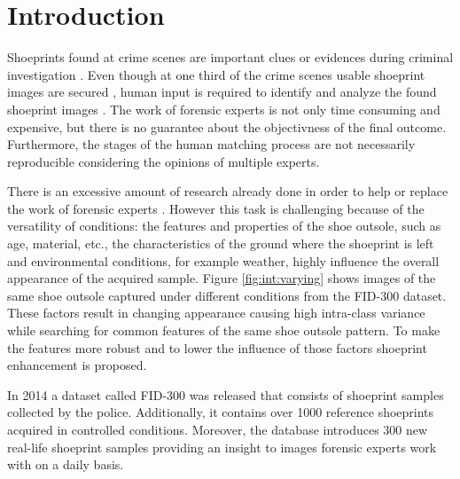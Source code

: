 \documentclass[draft,final]{vutinfth} %
\begin{document}
\chapter{Introduction}

\par
Shoeprints found at crime scenes are important clues or evidences during criminal investigation \cite{kong2014novel}.
Even though at one third of the crime scenes usable shoeprint images are secured \cite{alexandre1996computerized}, human input is required to identify and analyze the found shoeprint images  \cite{wang2014automatic}.
The work of forensic experts is not only time consuming and expensive, but there is no guarantee about the objectivness of the final outcome\cite{gueham2008automatic}.
Furthermore, the stages of the human matching process are not necessarily reproducible considering the opinions of multiple experts.
\par
There is an excessive amount of research already done in order to help or replace the work of forensic experts \cite{rida2019forensic}.
However this task is challenging because of the versatility of conditions: the features and properties of the shoe outsole, such as age, material, etc., the characteristics of the ground where the shoeprint is left and environmental conditions, for example weather, highly influence the overall appearance of the acquired sample.
Figure \ref{fig:int:varying} shows images of the same shoe outsole captured under different conditions from the FID-300 \cite{kortylewski2014unsupervised} dataset.
These factors result in changing appearance causing high intra-class variance while searching for common features of the same shoe outsole pattern.
To make the features more robust and to lower the influence of those factors shoeprint enhancement is proposed.
\par
In 2014 a dataset called FID-300 \cite{kortylewski2014unsupervised} was released that consists of shoeprint samples collected by the police. 
Additionally, it contains over 1000 reference shoeprints acquired in controlled conditions.
Moreover, the database introduces 300 new real-life shoeprint samples providing an insight to images forensic experts work with on a daily basis.
\end{document}
